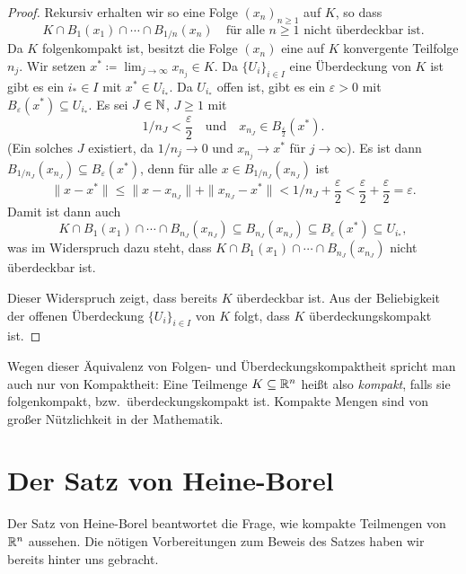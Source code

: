 \documentclass[a4paper,10pt]{article}
\begin{document}
\begin{proof}
 Rekursiv erhalten wir so eine Folge $(x_n)_{n \geq 1}$ auf $K$, so dass
 \[
  K \cap B_1(x_1) \cap \dotsb \cap B_{1/n}(x_n)
  \quad \text{für alle $n \geq 1$ nicht überdeckbar ist}.
 \]
 Da $K$ folgenkompakt ist, besitzt die Folge $(x_n)$ eine auf $K$ konvergente Teilfolge $n_j$. Wir setzen $x^* \coloneqq \lim_{j \to \infty} x_{n_j} \in K$. Da $\{U_i\}_{i \in I}$ eine Überdeckung von $K$ ist gibt es ein $i_* \in I$ mit $x^* \in U_{i_*}$. Da $U_{i_*}$ offen ist, gibt es ein $\varepsilon > 0$ mit $B_{\varepsilon}(x^*) \subseteq U_{i_*}$. Es sei $J \in \mathbb{N}$, $J \geq 1$ mit
 \[
  1/{n_J} < \frac{\varepsilon}{2}
  \quad
  \text{und}
  \quad
  x_{n_J} \in B_\frac{\varepsilon}{2}(x^*).
 \]
 (Ein solches $J$ existiert, da $1/{n_j} \to 0$ und $x_{n_j} \to x^*$ für $j \to \infty$). Es ist dann $B_{1/n_J}(x_{n_J}) \subseteq B_{\varepsilon}(x^*)$, denn für alle $x \in B_{1/n_J}(x_{n_J})$ ist
 \[
  \|x - x^*\|
  \leq \|x - x_{n_J}\| + \|x_{n_J} - x^*\|
  < 1/n_J + \frac{\varepsilon}{2}
  < \frac{\varepsilon}{2} + \frac{\varepsilon}{2}
  = \varepsilon.
 \]
 Damit ist dann auch
 \[
  K \cap B_1(x_1) \cap \dotsb \cap B_{n_J}(x_{n_J})
  \subseteq B_{n_J}(x_{n_J})
  \subseteq B_{\varepsilon}(x^*)
  \subseteq U_{i_*},
 \]
 was im Widerspruch dazu steht, dass $K \cap B_1(x_1) \cap \dotsb \cap B_{n_J}(x_{n_J})$ nicht überdeckbar ist.
  
 Dieser Widerspruch zeigt, dass bereits $K$ überdeckbar ist. Aus der Beliebigkeit der offenen Überdeckung $\{U_i\}_{i \in I}$ von $K$ folgt, dass $K$ überdeckungskompakt ist.
\end{proof}


Wegen dieser Äquivalenz von Folgen- und Überdeckungskompaktheit spricht man auch nur von Kompaktheit: Eine Teilmenge $K \subseteq \mathbb{R}^n$ heißt also \emph{kompakt}, falls sie folgenkompakt, bzw.\ überdeckungskompakt ist. Kompakte Mengen sind von großer Nützlichkeit in der Mathematik.





\section{Der Satz von Heine-Borel}
Der Satz von Heine-Borel beantwortet die Frage, wie kompakte Teilmengen von $\mathbb{R}^n$ aussehen. Die nötigen Vorbereitungen zum Beweis des Satzes haben wir bereits hinter uns gebracht.
\end{document}
